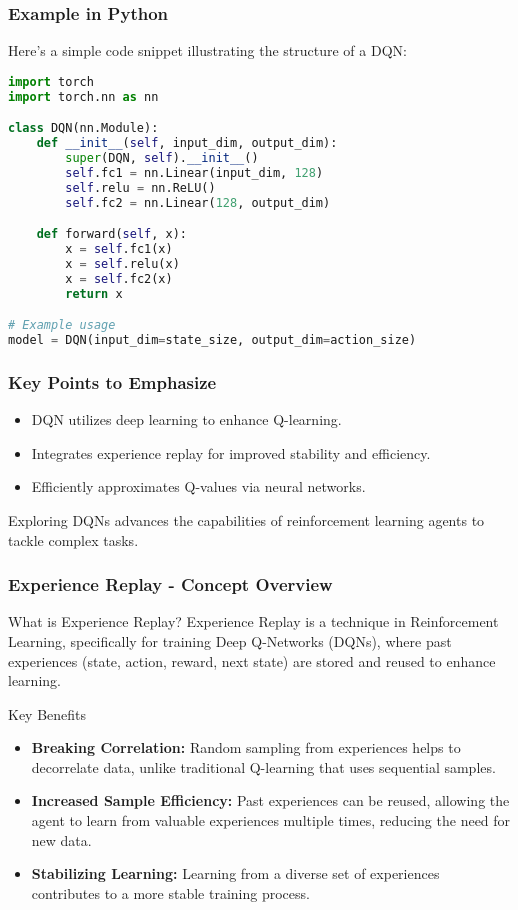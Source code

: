 \documentclass[aspectratio=169]{beamer}
\begin{document}
\begin{frame}[fragile]
    \frametitle{Example in Python}
    Here's a simple code snippet illustrating the structure of a DQN:
    \begin{lstlisting}[language=Python]
import torch
import torch.nn as nn

class DQN(nn.Module):
    def __init__(self, input_dim, output_dim):
        super(DQN, self).__init__()
        self.fc1 = nn.Linear(input_dim, 128)
        self.relu = nn.ReLU()
        self.fc2 = nn.Linear(128, output_dim)

    def forward(self, x):
        x = self.fc1(x)
        x = self.relu(x)
        x = self.fc2(x)
        return x

# Example usage
model = DQN(input_dim=state_size, output_dim=action_size)
    \end{lstlisting}
\end{frame}

\begin{frame}[fragile]
    \frametitle{Key Points to Emphasize}
    \begin{itemize}
        \item DQN utilizes deep learning to enhance Q-learning.
        \item Integrates experience replay for improved stability and efficiency.
        \item Efficiently approximates Q-values via neural networks.
    \end{itemize}
    Exploring DQNs advances the capabilities of reinforcement learning agents to tackle complex tasks.
\end{frame}

\begin{frame}[fragile]
  \frametitle{Experience Replay - Concept Overview}
  \begin{block}{What is Experience Replay?}
    Experience Replay is a technique in Reinforcement Learning, specifically for training Deep Q-Networks (DQNs), where past experiences (state, action, reward, next state) are stored and reused to enhance learning.
  \end{block}
  
  \begin{block}{Key Benefits}
    \begin{itemize}
      \item \textbf{Breaking Correlation:} Random sampling from experiences helps to decorrelate data, unlike traditional Q-learning that uses sequential samples.
      \item \textbf{Increased Sample Efficiency:} Past experiences can be reused, allowing the agent to learn from valuable experiences multiple times, reducing the need for new data.
      \item \textbf{Stabilizing Learning:} Learning from a diverse set of experiences contributes to a more stable training process.
    \end{itemize}
  \end{block}
\end{frame}
\end{document}
